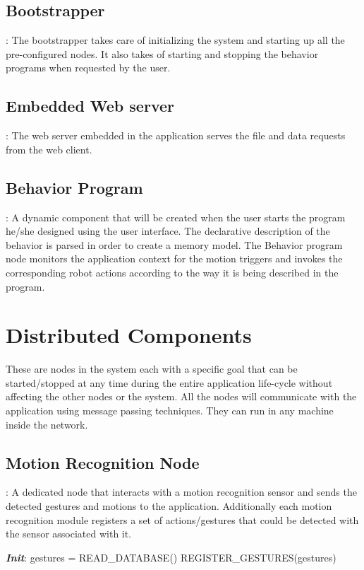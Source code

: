 \subsection{Bootstrapper} : The bootstrapper takes care of initializing the system and starting up all the pre-configured nodes. It also takes of starting and stopping the behavior programs when requested by the user. 
\subsection{Embedded Web server} : The web server embedded in the application serves the file and data requests from the web client.
\subsection{Behavior Program} : A dynamic component that will be created when the user starts the program he/she designed using the user interface. The declarative description of the behavior is parsed in order to create a memory model. The Behavior program node monitors the application context for the motion triggers and invokes the corresponding robot actions according to the way it is being described in the program.
\section{Distributed Components}
\label{ssec:dist_comp}
These are nodes in the system each with a specific goal that can be started/stopped at any time during the entire application life-cycle without affecting the other nodes or the system. All the nodes will communicate with the application using message passing techniques. They can run in any machine inside the network.

\subsection{Motion Recognition Node} : A dedicated node that interacts with a motion recognition sensor and sends the detected gestures and motions to the application. Additionally each motion recognition module registers a set of actions/gestures that could be detected with the sensor associated with it.
\begin{algorithm}
 \textbf{\emph{Init}}:\;
 \quad gestures = READ\_DATABASE() \;
 \quad REGISTER\_GESTURES(gestures) \;
\end{algorithm}

